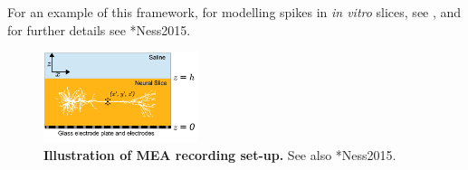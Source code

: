 For an example of this framework, for modelling spikes in {\it in vitro} slices, see , and for further details see \citeasnoun**{Ness2015}.
\begin{figure}[!ht]
\begin{center}
\includegraphics[width=0.4\textwidth]{Figures/Sigma/MEA_illustration.pdf}
\end{center}
\caption[]{\textbf{Illustration of MEA recording set-up.}
See also \citeasnoun**{Ness2015}.
}
\label{fig:Sigma:MEA_illustration}
\end{figure}


